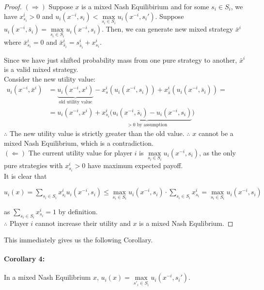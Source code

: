 \documentclass[12pt]{article}
\begin{document}
\begin{proof}
$(\Rightarrow)$ Suppose $x$ is a mixed Nash Equilibirium and for some $s_i \in S_i$, we have $x^i_{s_i} > 0$ and $u_i(x^{-i},s_i) < \max\limits_{s_i \in S_i} u_i(x^{-i},s_i')$. Suppose $u_i(x^{-i},\bar{s}_i) = \max\limits_{s_i \in S_i} u_i(x^{-i},s_i)$. Then, we can generate new mixed strategy $\bar{x}^i$ where $\bar{x}^i_{s_i} = 0$ and $\bar{x}^i_{\bar{s}_i} = s^i_{\bar{s}_i} + x^i_{s_i}$.

Since we have just shifted probability mass from one pure strategy to another, $\bar{x}^i$ is a valid mixed strategy.\\

Consider the new utility value:\\
$\begin{array}{rl}
u_i(x^{-i},\bar{x}^i) & = \underbrace{u_i(x^{-i},x^i)}_{\text{old utility value}} - x^i_s( u_i(x^{-i},s_i)) + x^i_{\bar{s}}(u_i(x^{-i},\bar{s}_i)) = \\
& = u_i(x^{-i},x^i)+ \underbrace{x^i_{s_i}(u_i(x^{-i},\bar{s}_i) - u_i(x^{-i},s_i)}_{> 0 \text{ by assumption}})
\end{array}$\\

$\therefore$ The new utility value is strictly greater than the old value. $\therefore$ $x$ cannot be a mixed Nash Equilibrium, which is a contradiction.\\

$(\Leftarrow)$ The current utility value for player $i$ is $\max\limits_{s_i \in S_i} u_i(x^{-i}, s_i)$, as the only pure strategies with $x^i_{s_i} > 0$ have maximum expected payoff.\\

It is clear that
\begin{center} $u_i(x) = \sum\limits_{s_i \in S_i} x^i_{s_i} u_i(x^{-i},s_i) \leq \max\limits_{s_i \in S_i} u_i(x^{-i},s_i) 
\cdot \sum\limits_{s_i \in S_i } x^i_{s_i} = \max\limits_{s_i \in S_i} u_i(x^{-i},s_i)$

\end{center} as $\sum\limits_{s_i \in S_i } x^i_{s_i} = 1$ by definition.\\

$\therefore$ Player $i$ cannot increase their utility and $x$ is a mixed Nash Equlibrium.
\end{proof}

This immediately gives us the following Corollary.
\paragraph{Corollary 4:} In a mixed Nash Equilibrium $x$, $u_i(x) = \max\limits_{s'_i \in S_i} u_i(x^{-i}, s_i')$.
\end{document}
